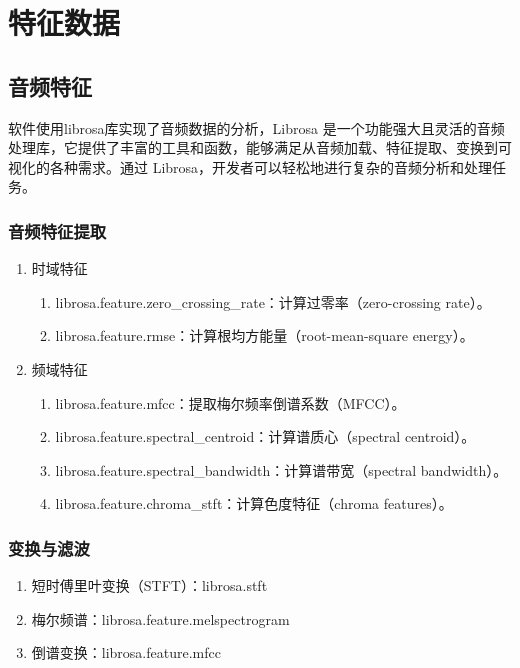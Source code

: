 \documentclass[lang=cn,newtx,12pt,scheme=chinese]{elegantbook}
\begin{document}
\chapter{特征数据}

\section{音频特征}

软件使用librosa库实现了音频数据的分析，Librosa 是一个功能强大且灵活的音频处理库，它提供了丰富的工具和函数，能够满足从音频加载、特征提取、变换到可视化的各种需求。通过 Librosa，开发者可以轻松地进行复杂的音频分析和处理任务。

\subsection{音频特征提取}

\begin{enumerate}
  \item 时域特征
  \begin{enumerate}
  \item librosa.feature.zero\_crossing\_rate：计算过零率（zero-crossing rate）。
  \item librosa.feature.rmse：计算根均方能量（root-mean-square energy）。
\end{enumerate}

  \item 频域特征
  \begin{enumerate}
  \item librosa.feature.mfcc：提取梅尔频率倒谱系数（MFCC）。
  \item librosa.feature.spectral\_centroid：计算谱质心（spectral centroid）。
  \item librosa.feature.spectral\_bandwidth：计算谱带宽（spectral bandwidth）。
  \item librosa.feature.chroma\_stft：计算色度特征（chroma features）。

	\end{enumerate}

\end{enumerate}


\subsection{变换与滤波}

\begin{enumerate}
  \item 短时傅里叶变换（STFT）：librosa.stft
  \item 梅尔频谱：librosa.feature.melspectrogram
  \item 倒谱变换：librosa.feature.mfcc
\end{enumerate}
\end{document}

